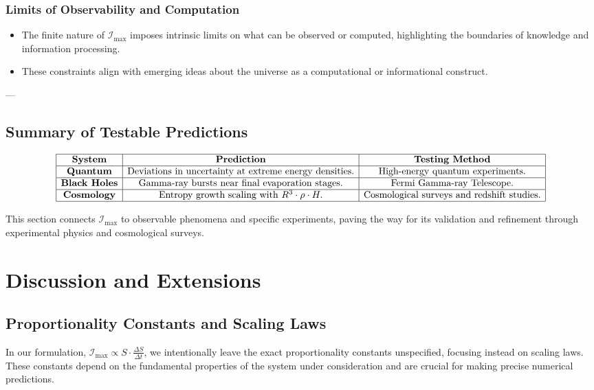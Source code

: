 \documentclass[12pt]{article}
\begin{document}
\subsubsection{Limits of Observability and Computation}
\begin{itemize}
    \item The finite nature of \( \mathcal{I}_{\text{max}} \) imposes intrinsic limits on what can be observed or computed, highlighting the boundaries of knowledge and information processing.
    \item These constraints align with emerging ideas about the universe as a computational or informational construct.
\end{itemize}

---

\subsection*{Summary of Testable Predictions}
\[
\begin{array}{|c|c|c|}
\hline
\textbf{System} & \textbf{Prediction} & \textbf{Testing Method} \\
\hline
\textbf{Quantum} & \text{Deviations in uncertainty at extreme energy densities.} & \text{High-energy quantum experiments.} \\
\hline
\textbf{Black Holes} & \text{Gamma-ray bursts near final evaporation stages.} & \text{Fermi Gamma-ray Telescope.} \\
\hline
\textbf{Cosmology} & \text{Entropy growth scaling with } R^3 \cdot \rho \cdot H. & \text{Cosmological surveys and redshift studies.} \\
\hline
\end{array}
\]

This section connects \( \mathcal{I}_{\text{max}} \) to observable phenomena and specific experiments, paving the way for its validation and refinement through experimental physics and cosmological surveys.


\section{Discussion and Extensions}

\subsection{Proportionality Constants and Scaling Laws}
In our formulation, \( \mathcal{I}_{\text{max}} \propto S \cdot \frac{\Delta S}{\Delta t} \), we intentionally leave the exact proportionality constants unspecified, focusing instead on scaling laws. These constants depend on the fundamental properties of the system under consideration and are crucial for making precise numerical predictions.
\end{document}
